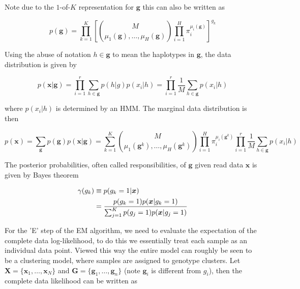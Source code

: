 \documentclass{article}
\begin{document}
Note due to the $1$-of-$K$ representation for $\boldsymbol{g}$ this can also be written as

\begin{equation} 
    p(\boldsymbol{g}) = \prod_{k = 1}^K \left[\binom{M}{\mu_1(\boldsymbol{g}),\dots,\mu_H(\boldsymbol{g})} \prod_{i = 1}^H \pi_i^{\mu_i(\boldsymbol{g})}\right]^{g_k}
\end{equation}

Using the abuse of notation $h \in \boldsymbol{g}$ to mean the haplotypes in $\boldsymbol{g}$, the data distribution is given by

\begin{equation} 
    p(\boldsymbol{x} | \boldsymbol{g}) = \prod_{i = 1}^{r} \sum_{h \in \boldsymbol{g}} p(h | g) p(x_i | h)  = \prod_{i = 1}^{r} \frac{1}{M} \sum_{h \in \boldsymbol{g}} p(x_i | h)
\end{equation}

where $p(x_i | h)$ is determined by an HMM. The marginal data distribution is then

\begin{equation} 
    p(\boldsymbol{x}) = \sum_{\boldsymbol{g}} p(\boldsymbol{g}) p(\boldsymbol{x} | \boldsymbol{g}) = \sum_{k = 1}^{K}  \binom{M}{\mu_1(\boldsymbol{g}^k),\dots,\mu_H(\boldsymbol{g}^k)} \prod_{i = 1}^H \pi_i^{\mu_i(\boldsymbol{g}^k)} \prod_{i = 1}^{r} \frac{1}{M} \sum_{h \in \boldsymbol{g}} p(x_i | h)
\end{equation}

The posterior probabilities, often called responsibilities, of $\boldsymbol{g}$ given read data $\boldsymbol{x}$ is given by Bayes theorem

\begin{align} 
    \gamma(g_k) &\equiv p(g_k = 1 | \boldsymbol{x}) \notag\\
    &= \frac{p(g_k = 1) p(\boldsymbol{x} | g_k = 1)}{\sum_{j = 1}^{K} p(g_j = 1) p(\boldsymbol{x} | g_j = 1)}
\end{align}

For the 'E' step of the EM algorithm, we need to evaluate the expectation of the complete data log-likelihood, to do this we essentially treat each sample as an individual data point. Viewed this way the entire model can roughly be seen to be a clustering model, where samples are assigned to genotype clusters. Let $\boldsymbol{X} = \{\boldsymbol{x}_1, \dots, \boldsymbol{x}_N\}$ and $\boldsymbol{G} = \{\boldsymbol{g}_1, \dots, \boldsymbol{g}_n\}$ (note $\boldsymbol{g}_i$ is different from $g_i$), then the complete data likelihood can be written as
\end{document}
